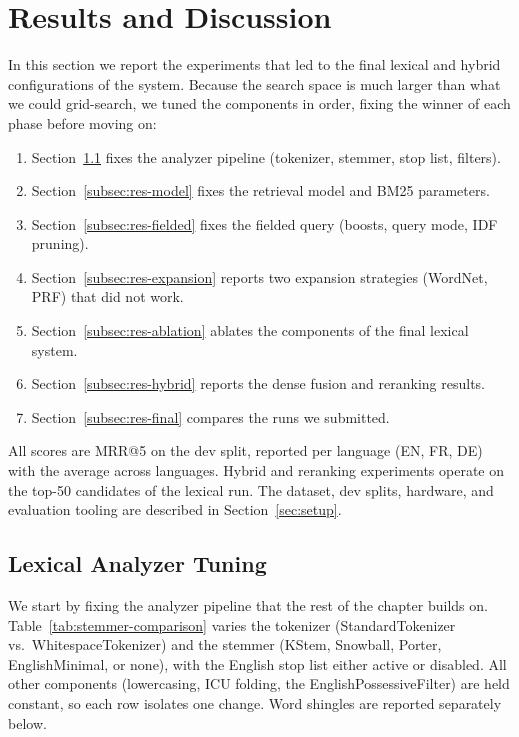 \section{Results and Discussion}
\label{sec:results}

In this section we report the experiments that led to the final lexical and hybrid configurations of the system. Because the search space is much larger than what we could grid-search, we tuned the components in order, fixing the winner of each phase before moving on:

\begin{enumerate}
    \item Section~\ref{subsec:res-analyzer} fixes the analyzer pipeline (tokenizer, stemmer, stop list, filters).
    \item Section~\ref{subsec:res-model} fixes the retrieval model and BM25 parameters.
    \item Section~\ref{subsec:res-fielded} fixes the fielded query (boosts, query mode, IDF pruning).
    \item Section~\ref{subsec:res-expansion} reports two expansion strategies (WordNet, PRF) that did not work.
    \item Section~\ref{subsec:res-ablation} ablates the components of the final lexical system.
    \item Section~\ref{subsec:res-hybrid} reports the dense fusion and reranking results.
    \item Section~\ref{subsec:res-final} compares the runs we submitted.
\end{enumerate}

All scores are MRR@5 on the dev split, reported per language (EN, FR, DE) with the average across languages. Hybrid and reranking experiments operate on the top-50 candidates of the lexical run. The dataset, dev splits, hardware, and evaluation tooling are described in Section~\ref{sec:setup}.

\subsection{Lexical Analyzer Tuning}
\label{subsec:res-analyzer}

We start by fixing the analyzer pipeline that the rest of the chapter builds on. Table~\ref{tab:stemmer-comparison} varies the tokenizer (StandardTokenizer vs.\ WhitespaceTokenizer) and the stemmer (KStem, Snowball, Porter, EnglishMinimal, or none), with the English stop list either active or disabled. All other components (lowercasing, ICU folding, the EnglishPossessiveFilter) are held constant, so each row isolates one change. Word shingles are reported separately below.

